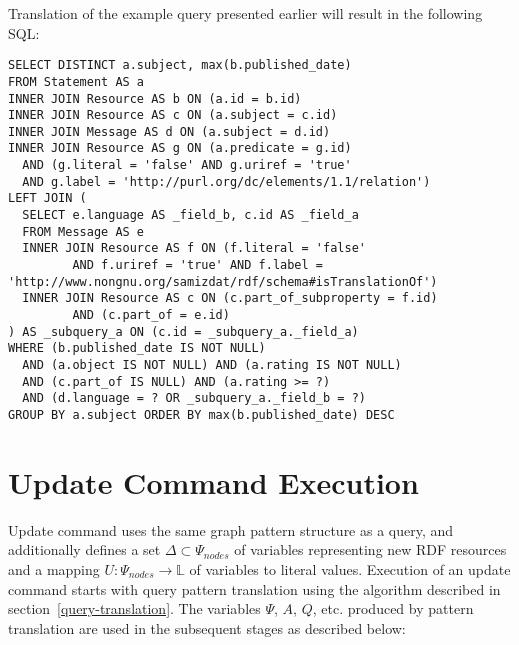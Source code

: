 \documentclass[conference,letterpaper]{IEEEtran}
\begin{document}
Translation of the example query presented earlier will result in the
following SQL:

\begin{Verbatim}[fontsize=\scriptsize]
SELECT DISTINCT a.subject, max(b.published_date)
FROM Statement AS a
INNER JOIN Resource AS b ON (a.id = b.id)
INNER JOIN Resource AS c ON (a.subject = c.id)
INNER JOIN Message AS d ON (a.subject = d.id)
INNER JOIN Resource AS g ON (a.predicate = g.id)
  AND (g.literal = 'false' AND g.uriref = 'true'
  AND g.label = 'http://purl.org/dc/elements/1.1/relation')
LEFT JOIN (
  SELECT e.language AS _field_b, c.id AS _field_a
  FROM Message AS e
  INNER JOIN Resource AS f ON (f.literal = 'false'
         AND f.uriref = 'true' AND f.label =
'http://www.nongnu.org/samizdat/rdf/schema#isTranslationOf')
  INNER JOIN Resource AS c ON (c.part_of_subproperty = f.id)
         AND (c.part_of = e.id)
) AS _subquery_a ON (c.id = _subquery_a._field_a)
WHERE (b.published_date IS NOT NULL)
  AND (a.object IS NOT NULL) AND (a.rating IS NOT NULL)
  AND (c.part_of IS NULL) AND (a.rating >= ?)
  AND (d.language = ? OR _subquery_a._field_b = ?)
GROUP BY a.subject ORDER BY max(b.published_date) DESC
\end{Verbatim}


\section{Update Command Execution}
\label{update-execution}

Update command uses the same graph pattern structure as a query, and
additionally defines a set $\Delta \subset \Psi_{nodes}$ of variables
representing new RDF resources and a mapping $U: \Psi_{nodes} \to
\mathbb{L}$ of variables to literal values. Execution of an update
command starts with query pattern translation using the algorithm
described in section~\ref{query-translation}. The variables $\Psi$, $A$,
$Q$, etc. produced by pattern translation are used in the subsequent
stages as described below:
\end{document}
